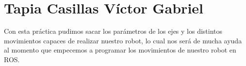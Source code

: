 \documentclass[11pt,a4paper,oldfontcommands,oneside]{memoir}
\begin{document}
\section{Tapia Casillas Víctor Gabriel}
Con esta práctica pudimos sacar los parámetros de los ejes y los distintos movimientos capaces de realizar nuestro robot, lo cual nos será de mucha ayuda al momento que empecemos a programar los movimientos de nuestro robot en ROS.


\vspace{2cm}
\hfill
\cite{Nobody06}


\end{document}
